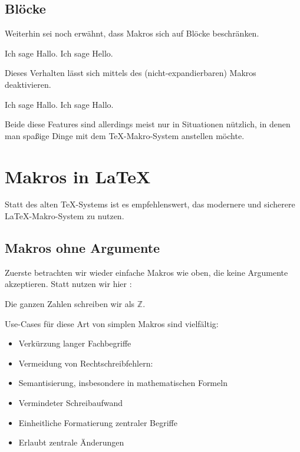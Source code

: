 \subsection{Blöcke}

Weiterhin sei noch erwähnt, dass Makros sich auf Blöcke beschränken.
\begin{latexlisting}
	\def\aaa{Hello}
	{
		\def\aaa{Hallo}
		Ich sage \aaa .
	}
	Ich sage \aaa .
\end{latexlisting}
Dieses Verhalten lässt sich mittels des (nicht-expandierbaren) Makros  deaktivieren.
\begin{latexlisting}
	\def\aaa{Hello}
	{
		\global\def\aaa{Hallo}
		Ich sage \aaa .
	}
	Ich sage \aaa .
\end{latexlisting}
Beide diese Features sind allerdings meist nur in Situationen nützlich, in denen man spaßige Dinge mit dem \TeX-Makro-System anstellen möchte.

\section{Makros in \LaTeX}

Statt des alten \TeX-Systems ist es empfehlenswert, das modernere und sicherere \LaTeX-Makro-System zu nutzen.

\subsection{Makros ohne Argumente}
Zuerste betrachten wir wieder einfache Makros wie oben, die keine Argumente akzeptieren.
Statt  nutzen wir hier :
\begin{latexlisting}
	\newcommand{\integers}{\mathds{Z}}

	Die ganzen Zahlen schreiben wir als $\integers$.
\end{latexlisting}
Use-Cases für diese Art von simplen Makros sind vielfältig:
\begin{itemize}
	\item Verkürzung langer Fachbegriffe
	\item Vermeidung von Rechtschreibfehlern:
	\begin{latexlisting}
		\newcommand{\DNA}{Desoxyribonukleinsäure}
	\end{latexlisting}
	\item Semantisierung, insbesondere in mathematischen Formeln
	\begin{latexlisting}
		\newcommand{\iff}{\Leftrightarrow}
	\end{latexlisting}
	\item Vermindeter Schreibaufwand
	\item Einheitliche Formatierung zentraler Begriffe
	\begin{latexlisting}
		\newcommand{\germany}{\texttt{[image: germany-flag.png]} \textbf{Germany}}
	\end{latexlisting}
	\item Erlaubt zentrale Änderungen
	\begin{latexlisting}
		\newcommand{\toolname}{NetVisard}
	\end{latexlisting}
\end{itemize}

